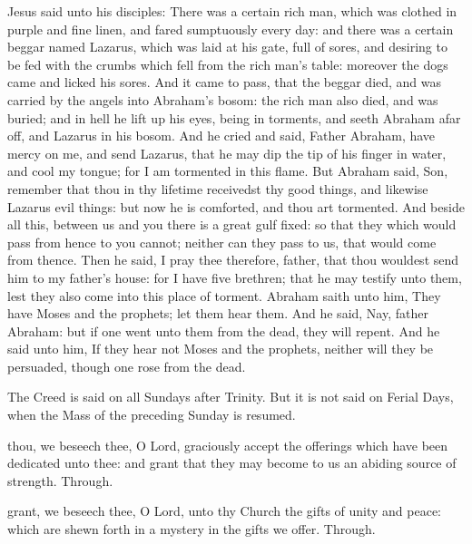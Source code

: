  Jesus said unto his disciples: There was a certain rich man, which was clothed in purple and fine linen, and fared sumptuously every day: and there was a certain beggar named Lazarus, which was laid at his gate, full of sores, and desiring to be fed with the crumbs which fell from the rich man's table: moreover the dogs came and licked his sores. And it came to pass, that the beggar died, and was carried by the angels into Abraham's bosom: the rich man also died, and was buried; and in hell he lift up his eyes, being in torments, and seeth Abraham afar off, and Lazarus in his bosom. And he cried and said, Father Abraham, have mercy on me, and send Lazarus, that he may dip the tip of his finger in water, and cool my tongue; for I am tormented in this flame. But Abraham said, Son, remember that thou in thy lifetime receivedst thy good things, and likewise Lazarus evil things: but now he is comforted, and thou art tormented. And beside all this, between us and you there is a great gulf fixed: so that they which would pass from hence to you cannot; neither can they pass to us, that would come from thence. Then he said, I pray thee therefore, father, that thou wouldest send him to my father's house: for I have five brethren; that he may testify unto them, lest they also come into this place of torment. Abraham saith unto him, They have Moses and the prophets; let them hear them. And he said, Nay, father Abraham: but if one went unto them from the dead, they will repent. And he said unto him, If they hear not Moses and the prophets, neither will they be persuaded, though one rose from the dead.
\begin{rubric}
    The Creed is said on all Sundays after Trinity. But it is not said on Ferial Days, when the Mass of the preceding Sunday is resumed.
\end{rubric}
\secret
{} thou, we beseech thee, O Lord, graciously accept the offerings which have been dedicated unto thee: and grant that they may become to us an abiding source of strength. Through.

 grant, we beseech thee, O Lord, unto thy Church the gifts of unity and peace: which are shewn forth in a mystery in the gifts we offer. Through.


